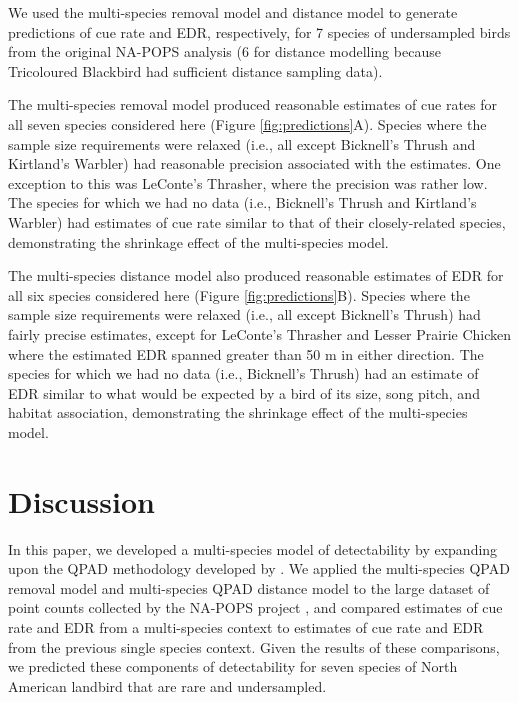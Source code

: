 \documentclass[12pt]{article}
\begin{document}
\par We used the multi-species removal model and distance model to generate predictions of cue rate and EDR, respectively, for 7 species of undersampled birds from the original NA-POPS analysis (6 for distance modelling because Tricoloured Blackbird had sufficient distance sampling data).

\par The multi-species removal model produced reasonable estimates of cue rates for all seven species considered here (Figure \ref{fig:predictions}A).
Species where the sample size requirements were relaxed (i.e., all except Bicknell's Thrush and Kirtland's Warbler) had reasonable precision associated with the estimates.
One exception to this was LeConte's Thrasher, where the precision was rather low.
The species for which we had no data (i.e., Bicknell's Thrush and Kirtland's Warbler) had estimates of cue rate similar to that of their closely-related species, demonstrating the shrinkage effect of the multi-species model.

\par The multi-species distance model also produced reasonable estimates of EDR for all six species considered here (Figure \ref{fig:predictions}B).
Species where the sample size requirements were relaxed (i.e., all except Bicknell's Thrush) had fairly precise estimates, except for LeConte's Thrasher and Lesser Prairie Chicken where the estimated EDR spanned greater than 50 m in either direction.
The species for which we had no data (i.e., Bicknell's Thrush) had an estimate of EDR similar to what would be expected by a bird of its size, song pitch, and habitat association, demonstrating the shrinkage effect of the multi-species model.

\section{Discussion}

\par In this paper, we developed a multi-species model of detectability by expanding upon the QPAD methodology developed by \citet{solymos_calibrating_2013}.
We applied the multi-species QPAD removal model and multi-species QPAD distance model to the large dataset of point counts collected by the NA-POPS project \citep{edwards_point_2023}, and compared estimates of cue rate and EDR from a multi-species context to estimates of cue rate and EDR from the previous single species context.
Given the results of these comparisons, we predicted these components of detectability for seven species of North American landbird that are rare and undersampled.
\end{document}

